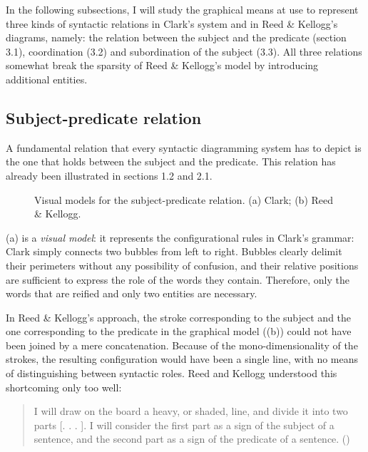 \documentclass[output=paper]{langsci/langscibook}
\begin{document}
In the following subsections, I will study the graphical means at use to represent three kinds of syntactic relations in Clark’s system and in Reed \& Kellogg’s diagrams, namely: the relation between the subject and the predicate (section 3.1), coordination (3.2) and subordination of the subject (3.3). All three relations somewhat break the sparsity of Reed \& Kellogg’s model by introducing additional entities.

\subsection{Subject-predicate relation}

A fundamental relation that every syntactic diagramming system has to depict is the one that holds between the subject and the predicate. This relation has already been illustrated in sections 1.2 and 2.1.

\begin{figure}
    \caption{Visual models for the subject-predicate relation. (a) Clark; (b) Reed \& Kellogg.\label{fig:4:5}}
\end{figure}


(a) is a \textit{visual model}: it represents the configurational rules in Clark’s grammar: Clark simply connects two bubbles from left to right. Bubbles clearly delimit their perimeters without any possibility of confusion, and their relative positions are sufficient to express the role of the words they contain. Therefore, only the words that are reified and only two entities are necessary.

In Reed \& Kellogg’s approach, the stroke corresponding to the subject and the one corresponding to the predicate in the graphical model ((b)) could not have been joined by a mere concatenation. Because of the mono-dimensionality of the strokes, the resulting configuration would have been a single line, with no means of distinguishing between syntactic roles. Reed and Kellogg understood this shortcoming only too well:

\begin{quote}
I will draw on the board a heavy, or shaded, line, and divide it into two parts [. . . ]. I will consider the first part as a sign of the subject of a sentence, and the second part as a sign of the predicate of a sentence. (\citealt[17]{reed_graded_1879})
\end{quote}
\end{document}
